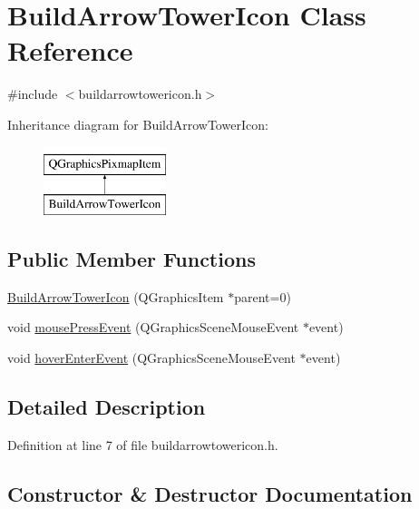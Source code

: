 \hypertarget{class_build_arrow_tower_icon}{}\section{Build\+Arrow\+Tower\+Icon Class Reference}
\label{class_build_arrow_tower_icon}


{\ttfamily \#include $<$buildarrowtowericon.\+h$>$}

Inheritance diagram for Build\+Arrow\+Tower\+Icon\+:\begin{figure}[H]
\begin{center}
\leavevmode
\includegraphics[height=2.000000cm]{class_build_arrow_tower_icon}
\end{center}
\end{figure}
\subsection*{Public Member Functions}
\begin{DoxyCompactItemize}
\item 
\hyperlink{class_build_arrow_tower_icon_af47deb48013cd6e384bc6713bd783f6e}{Build\+Arrow\+Tower\+Icon} (Q\+Graphics\+Item $\ast$parent=0)
\item 
void \hyperlink{class_build_arrow_tower_icon_ac2c2f51dd778437f191345b06751a785}{mouse\+Press\+Event} (Q\+Graphics\+Scene\+Mouse\+Event $\ast$event)
\item 
void \hyperlink{class_build_arrow_tower_icon_aad1a1a9846e6ccf27ca2becce40ce152}{hover\+Enter\+Event} (Q\+Graphics\+Scene\+Mouse\+Event $\ast$event)
\end{DoxyCompactItemize}


\subsection{Detailed Description}


Definition at line 7 of file buildarrowtowericon.\+h.



\subsection{Constructor \& Destructor Documentation}
\mbox{\label{class_build_arrow_tower_icon_af47deb48013cd6e384bc6713bd783f6e}} 
